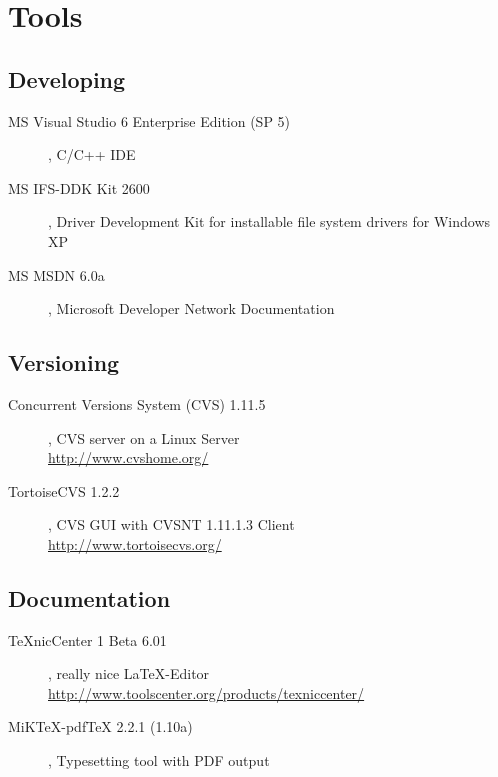 \chapter{Tools}
\label{cha:tools}

\section{Developing}
\begin{description}
\item[MS Visual Studio 6 Enterprise Edition (SP 5)], C/C++ IDE
\item[MS IFS-DDK Kit 2600], Driver Development Kit for installable file system drivers for Windows XP
\item[MS MSDN 6.0a], Microsoft Developer Network Documentation
\end{description}

\section{Versioning}
\begin{description}
\item[Concurrent Versions System (CVS) 1.11.5], CVS server on a Linux Server\\ \mbox{\url{http://www.cvshome.org/}}
\item[TortoiseCVS 1.2.2], CVS GUI with CVSNT 1.11.1.3 Client\\ \mbox{\url{http://www.tortoisecvs.org/}}
\end{description}

\section{Documentation}
\begin{description}
\item[TeXnicCenter 1 Beta 6.01], really nice \LaTeX-Editor\\ \mbox{\url{http://www.toolscenter.org/products/texniccenter/}}
\item[MiKTeX-pdfTeX 2.2.1 (1.10a)], Typesetting tool with PDF output
\end{description}
